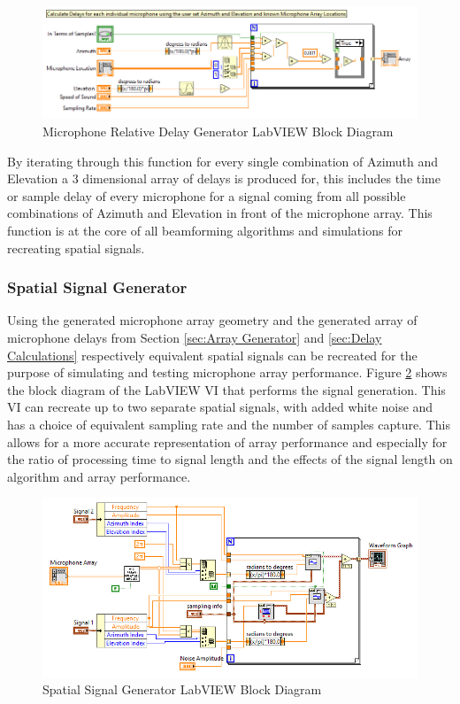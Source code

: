 \documentclass{UoNMCHA}
\numberwithin{equation}{section}
\begin{document}
    \begin{figure}[H]
        \centering
        \includegraphics[keepaspectratio, width = \textwidth]{Figures/DelayCalcBlock.png}
        \caption{Microphone Relative Delay Generator LabVIEW Block Diagram}
        \label{fig:MicDelayBlock}
    \end{figure}    
    
    By iterating through this function for every single combination of Azimuth and Elevation a 3 dimensional array of delays is produced for, this includes the time or sample delay of every microphone for a signal coming from all possible combinations of Azimuth and Elevation in front of the microphone array. This function is at the core of all beamforming algorithms and simulations for recreating spatial signals.
    
\subsubsection{Spatial Signal Generator} \label{sec:Signal Generator}
    Using the generated microphone array geometry and the generated array of microphone delays from Section \ref{sec:Array Generator} and \ref{sec:Delay Calculations} respectively equivalent spatial signals can be recreated for the purpose of simulating and testing microphone array performance. Figure \ref{fig:SignalGenBlock} shows the block diagram of the LabVIEW VI that performs the signal generation. This VI can recreate up to two separate spatial signals, with added white noise and has a choice of equivalent sampling rate and the number of samples capture. This allows for a more accurate representation of array performance and especially for the ratio of processing time to signal length and the effects of the signal length on algorithm and array performance. 
    
    \begin{figure}[H]
        \centering
        \includegraphics[keepaspectratio, width = \textwidth]{Figures/SignalGenBlock.png}
        \caption{Spatial Signal Generator LabVIEW Block Diagram}
        \label{fig:SignalGenBlock}
    \end{figure}    
    
\end{document}
